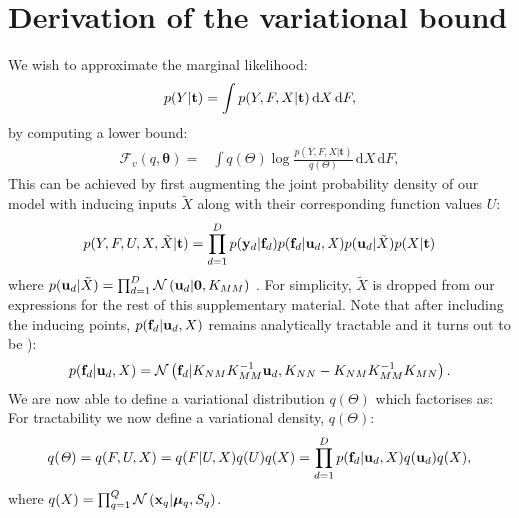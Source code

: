 \section{Derivation of the variational bound}

We wish to approximate the marginal likelihood:
\begin{equation}
\label{marginalLikelihoodSuppl}
p(Y | \mathbf{t}) =  \int p( Y , F, X| \mathbf{t}) \, \mathrm{d} X \,\mathrm{d}F,
\end{equation}
by computing a lower bound:
\begin{align}
\mathcal{F}_v(q, \boldsymbol \theta) = {}& \int q(\mathit{\Theta}) \log 
		\frac{ p(Y , F , \mathit{X} | \mathbf{t})}
			 {q(\mathit{\Theta})}  \, \mathrm{d} X \,\mathrm{d}F,
		 \label{jensens1Suppl}
\end{align}
%
This can be achieved by first augmenting the joint probability density
of our model with inducing inputs $\tilde{X}$ along with their
corresponding function values $U$:
\begin{equation}
 \label{augmentedJointSuppl}
p(Y,F, U,X,\tilde{X} | \mathbf{t}) = \prod_{d=1}^D p(\mathbf{y}_d | \mathbf{f}_d) p(\mathbf{f}_d | \mathbf{u}_d, \mathit{X})
p(\mathbf{u}_d | \tilde{X})  p(X | \mathbf{t})
\end{equation}
where $p(\mathbf{u}_d | \tilde{X}) = \prod_{d=1}^D \mathcal{N} \left( \mathbf{u}_d
  | \mathbf{0}, K_{MM} \right)$ . For simplicity, $\tilde{X}$ is
dropped from our expressions for the rest of this supplementary
material. Note that after including the inducing points, $p(\mathbf{f}_d |
\mathbf{u}_d, X)$ remains analytically tractable and it turns out to be
\cite{rasmussen-williams}):
\begin{equation}
 \label{priorF2Suppl}
p(\mathbf{f}_d | \mathbf{u}_d, X) =  \mathcal{N}  \left( \mathbf{f}_d | K_{NM} K_{MM}^{-1} \mathbf{u}_d , K_{NN} - K_{NM} K_{MM}^{-1} K_{MN} \right).
\end{equation}
We are now able to define a variational distribution $q(\Theta)$ which
factorises as: For tractability we now define a variational density,
$q(\Theta)$:
\begin{equation}
\label{varDistrSuppl}
q(\mathit{\Theta}) = q(F, U,X) = q(F | U, X) q(U) q(X) = \prod_{d=1}^D p(\mathbf{f}_d | \mathbf{u}_d, X )q(\mathbf{u}_d) q(X),
\end{equation}
%
%
where $q(X) = \prod_{q=1}^Q \mathcal{N} \left( \mathbf{x}_q | \boldsymbol \mu_q, S_q \right)$. 
